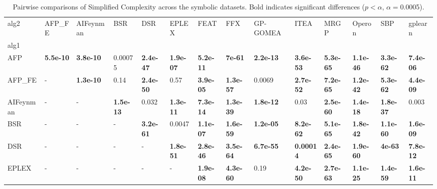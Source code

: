 \begin{table}
\centering
\tiny
\caption{Pairwise comparisons of Simplified Complexity across the symbolic datasets. Bold indicates significant differences ($p<\alpha$, $\alpha=$0.0005).}
\begin{tabular}{llllllllllllll}
\toprule
alg2 &           AFP\_FE &        AIFeynman &              BSR &              DSR &            EPLEX &             FEAT &              FFX &         GP-GOMEA &             ITEA &             MRGP &           Operon &              SBP &          gplearn \\
alg1      &                  &                  &                  &                  &                  &                  &                  &                  &                  &                  &                  &                  &                  \\
\midrule
AFP       &  \textbf{5.5e-10} &  \textbf{3.8e-10} &          0.00075 &  \textbf{2.4e-47} &  \textbf{1.9e-07} &  \textbf{5.2e-11} &    \textbf{7e-61} &  \textbf{2.2e-13} &  \textbf{3.6e-53} &  \textbf{5.3e-65} &  \textbf{1.1e-46} &  \textbf{3.3e-62} &  \textbf{7.4e-06} \\
AFP\_FE    &                - &  \textbf{1.3e-10} &             0.14 &  \textbf{2.4e-50} &             0.57 &  \textbf{3.9e-05} &  \textbf{1.3e-57} &           0.0069 &  \textbf{2.7e-52} &  \textbf{7.2e-65} &  \textbf{1.2e-42} &  \textbf{5.3e-62} &  \textbf{4.4e-09} \\
AIFeynman &                - &                - &  \textbf{1.5e-13} &            0.032 &  \textbf{1.3e-11} &  \textbf{7.3e-14} &  \textbf{1.3e-39} &  \textbf{1.8e-12} &             0.03 &  \textbf{2.5e-60} &  \textbf{1.4e-18} &  \textbf{1.8e-37} &            0.003 \\
BSR       &                - &                - &                - &  \textbf{3.2e-61} &           0.0047 &  \textbf{1.1e-07} &  \textbf{1.6e-59} &  \textbf{1.2e-05} &  \textbf{8.2e-62} &  \textbf{5.1e-65} &  \textbf{1.8e-42} &  \textbf{1.1e-60} &  \textbf{1.6e-09} \\
DSR       &                - &                - &                - &                - &  \textbf{1.8e-51} &  \textbf{2.8e-46} &  \textbf{3.5e-64} &  \textbf{6.7e-55} &  \textbf{0.00014} &  \textbf{2.4e-65} &  \textbf{1.9e-60} &    \textbf{4e-63} &  \textbf{7.8e-12} \\
EPLEX     &                - &                - &                - &                - &                - &  \textbf{1.9e-08} &  \textbf{4.3e-60} &             0.19 &  \textbf{4.2e-50} &  \textbf{2.7e-63} &  \textbf{1.1e-25} &  \textbf{1.4e-59} &  \textbf{1.6e-11} \\

\end{tabular}
\end{table}
